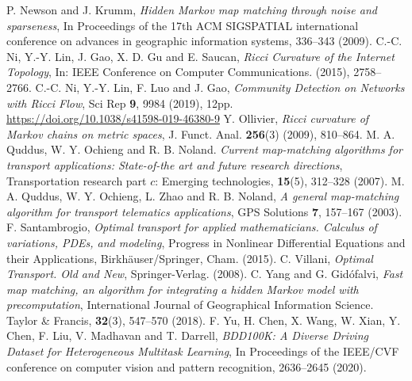 \documentclass{article}
\numberwithin{equation}{section}
\theoremstyle{definition}
\begin{document}
\begin{small}
\begin{thebibliography}{YCWXCLMD}
 P. Newson and J. Krumm, \textit{Hidden Markov map matching through noise and sparseness}, In Proceedings of the 17th ACM SIGSPATIAL international conference on advances in geographic information systems, 336--343 (2009). 
 C.-C. Ni, Y.-Y. Lin, J. Gao, X. D. Gu and E. Saucan, \textit{Ricci Curvature of the Internet Topology}, In: IEEE Conference on Computer Communications. (2015), 2758--2766.
 C.-C. Ni, Y.-Y. Lin, F. Luo and J. Gao, \textit{Community Detection on Networks with Ricci Flow}, Sci Rep \textbf{9}, 9984 (2019), 12pp. \\
\url{https://doi.org/10.1038/s41598-019-46380-9}
  Y. Ollivier, \textit{Ricci curvature of Markov chains on metric spaces}, J. Funct. Anal. \textbf{256}(3) (2009), 810--864.
 M. A. Quddus, W. Y. Ochieng and R. B. Noland. \textit{Current map-matching algorithms for transport applications: State-of-the art and future research directions}, Transportation research part $c$: Emerging technologies, \textbf{15}(5), 312--328 (2007).
 M. A. Quddus, W. Y. Ochieng, L. Zhao and  R. B. Noland, \textit{A general map-matching algorithm for transport telematics applications}, GPS Solutions \textbf{7}, 157--167 (2003). 
 F. Santambrogio, \textit{Optimal transport for applied mathematicians. Calculus of variations, PDEs, and modeling}, Progress in Nonlinear Differential Equations and their Applications, Birkh\"{a}user/Springer, Cham. (2015).
 C. Villani, \textit{Optimal Transport. Old and New}, Springer-Verlag. (2008).
 C. Yang and G. Gid\' ofalvi, \textit{Fast map matching, an algorithm for integrating a hidden Markov model with precomputation}, International Journal of Geographical Information Science. Taylor \& Francis, \textbf{32}(3), 547--570 (2018).
 F. Yu, H. Chen, X. Wang, W. Xian, Y. Chen, F. Liu, V. Madhavan and T. Darrell, \textit{BDD100K: A Diverse Driving Dataset for Heterogeneous Multitask Learning}, In Proceedings of the IEEE/CVF conference on computer vision and pattern recognition, 2636--2645 (2020).
\end{thebibliography}
\end{small}
\end{document}

